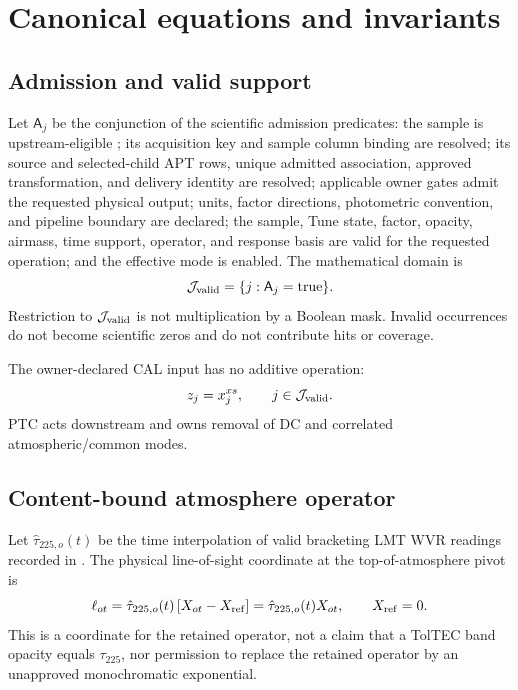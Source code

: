 \section{Canonical equations and invariants}
\label{sec:equations}

\subsection{Admission and valid support}

Let \(\mathsf A_j\) be the conjunction of the scientific admission predicates:
the sample is upstream-eligible ; its acquisition key and sample
column binding are resolved; its source and selected-child APT rows, unique
admitted association, approved transformation, and delivery identity are
resolved; applicable owner gates admit the requested physical output; units,
factor directions, photometric convention, and pipeline boundary are declared;
the sample, Tune state, factor, opacity, airmass, time support, operator,
and response basis are valid for the requested operation; and the effective
mode is enabled. The mathematical domain is
\begin{equation}
  \mathcal{J}_{\mathrm{valid}}=\{j:\mathsf A_j=\mathrm{true}\}.
  \label{eq:valid-support}
\end{equation}
Restriction to \(\mathcal{J}_{\mathrm{valid}}\) is not multiplication by a Boolean mask. Invalid
occurrences do not become scientific zeros and do not contribute hits or
coverage.

The owner-declared CAL input has no additive operation:
\begin{equation}
  z_j=x^{xs}_j,\qquad j\in\mathcal{J}_{\mathrm{valid}}.
  \label{eq:affine-input}
\end{equation}
PTC acts downstream and owns removal of DC and correlated atmospheric/common
modes.

\subsection{Content-bound atmosphere operator}
\label{sec:atmos-equations}

Let \(\hat\tau_{225,o}(t)\) be the time interpolation of valid bracketing LMT
WVR readings recorded in . The physical line-of-sight coordinate
at the top-of-atmosphere pivot is
\begin{equation}
  \ell_{ot}=\hat\tau_{225,o}(t)\,[X_{ot}-X_{\rm ref}]
  =\hat\tau_{225,o}(t)X_{ot},\qquad X_{\rm ref}=0.
  \label{eq:los-coordinate}
\end{equation}
This is a coordinate for the retained operator, not a claim that a TolTEC
band opacity equals \(\tau_{225}\), nor permission to replace the retained
operator by an unapproved monochromatic exponential.

